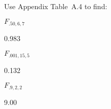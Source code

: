 \begin{problem}
  Use Appendix Table~A.4 to find:
\end{problem}

\begin{subproblem}
  $F_{.50,6,7}$
\end{subproblem}

0.983

\begin{subproblem}
  $F_{.001,15,5}$
\end{subproblem}

0.132

\begin{subproblem}
  $F_{.9,2,2}$
\end{subproblem}

9.00
